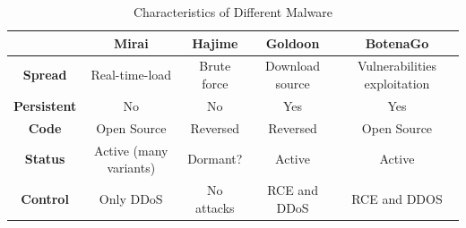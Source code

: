 \begin{table}[ht]
	\centering
	\begin{tabular}{|c|c|c|c|c|}
		\hline
		 & \textbf{Mirai} & \textbf{Hajime} & \textbf{Goldoon} & \textbf{BotenaGo} \\
		\hline
		\textbf{Spread} & Real-time-load & Brute force & Download source & Vulnerabilities exploitation \\
		\hline
		\textbf{Persistent} & No & No & Yes & Yes \\
		\hline
		\textbf{Code} & Open Source & Reversed & Reversed & Open Source \\
		\hline
		\textbf{Status} & Active (many variants) & Dormant? & Active & Active \\
		\hline
		\textbf{Control} & Only DDoS & No attacks & RCE and DDoS & RCE and DDOS \\
		\hline
	\end{tabular}
	\caption{Characteristics of Different Malware}
	\label{tab:malware_characteristics}
\end{table}

